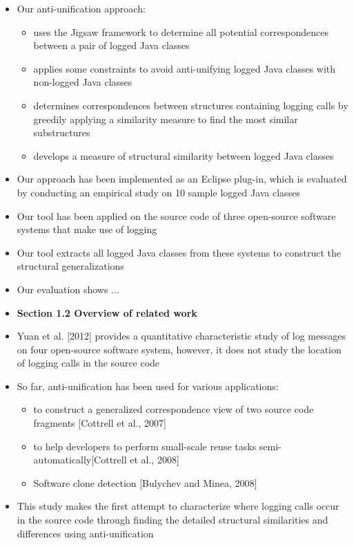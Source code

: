 \documentclass{article}
\newcommand{\bold}{\textbf}
\begin{document}
\begin{itemize} [leftmargin=.1in]
\item{Our anti-unification approach:}
\begin{itemize}
\item uses the Jigsaw framework to determine all potential correspondences between a pair of logged Java classes
\item applies some constraints to avoid anti-unifying logged Java classes with non-logged Java classes
\item determines correspondences between structures containing logging calls by greedily applying a similarity measure to find the most similar substructures
\item develops a measure of structural similarity between logged Java classes
\end{itemize}

\item Our approach has been implemented as an Eclipse plug-in, which is evaluated by conducting an empirical study on 10 sample logged Java classes
\item Our tool has been applied on the source code of three open-source software systems that make use of logging
\item Our tool extracts all logged Java classes from these systems to construct the structural generalizations
\item Our evaluation shows ...

\item \bold{Section 1.2 Overview of related work}
\item Yuan et al. [2012]  provides a quantitative characteristic study of log messages on four open-source software system, however, it does not study the location of logging calls in the source code
\item So far, anti-unification has been used for various applications:
\begin{itemize}
\item to construct a generalized correspondence view of two source code fragments [Cottrell et al., 2007]
\item to help developers to perform small-scale reuse tasks semi-automatically[Cottrell et al., 2008]
\item Software clone detection [Bulychev and Minea, 2008]
\end{itemize}
\item This study makes the first attempt to characterize where logging calls occur in the source code through finding the detailed structural similarities and differences using anti-unification


\end{itemize}
\end{document}
